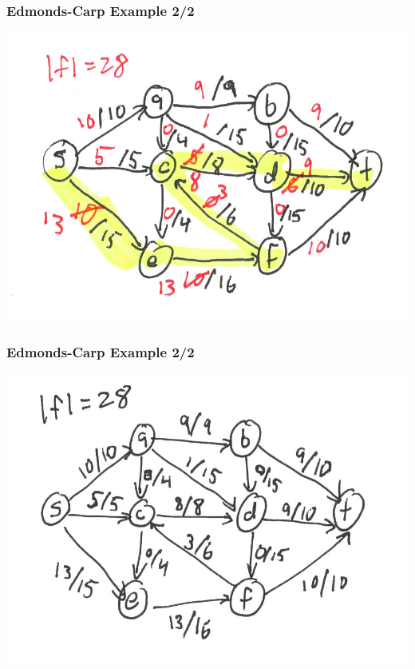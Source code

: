 \documentclass{beamer}
\begin{document}
\begin{frame} \frametitle{Edmonds-Carp Example 2/2}
\begin{center}
  \includegraphics[scale=1]{ek-2-6.png}
\end{center}
\end{frame}

\begin{frame} \frametitle{Edmonds-Carp Example 2/2}
\begin{center}
  \includegraphics[scale=1]{ek-2-7.png}
\end{center}
\end{frame}
\end{document}
